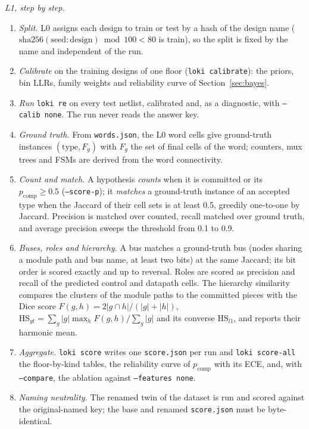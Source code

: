 \documentclass[conference]{IEEEtran}
\newcommand{\code}[1]{\texttt{#1}}
\begin{document}
\emph{L1, step by step.}
\begin{enumerate}
\item \emph{Split.} L0 assigns each design to train or test by a hash of the design name
 ($\mathrm{sha256}(\mathrm{seed}{:}\mathrm{design})\bmod 100<80$ is train), so the split is
 fixed by the name and independent of the run.
\item \emph{Calibrate} on the training designs of one floor (\code{loki calibrate}): the
 priors, bin LLRs, family weights and reliability curve of Section~\ref{sec:bayes}.
\item \emph{Run} \code{loki re} on every test netlist, calibrated and, as a diagnostic,
 with \code{--calib none}. The run never reads the answer key.
\item \emph{Ground truth.} From \code{words.json}, the L0 word cells give ground-truth
 instances $(\mathrm{type},F_g)$ with $F_g$ the set of final cells of the word; counters,
 mux trees and FSMs are derived from the word connectivity.
\item \emph{Count and match.} A hypothesis \emph{counts} when it is committed or its
 $p_{\mathrm{comp}}\ge 0.5$ (\code{--score-p}); it \emph{matches} a ground-truth instance of
 an accepted type when the Jaccard of their cell sets is at least 0.5, greedily
 one-to-one by Jaccard. Precision is matched over counted, recall matched over ground truth,
 and average precision sweeps the threshold from 0.1 to 0.9.
\item \emph{Buses, roles and hierarchy.} A bus matches a ground-truth bus (nodes sharing a
 module path and bus name, at least two bits) at the same Jaccard; its bit order is scored
 exactly and up to reversal. Roles are scored as precision and recall of the predicted
 control and datapath cells. The hierarchy similarity compares the clusters of the module
 paths to the committed pieces with the Dice score $F(g,h)=2|g\cap h|/(|g|+|h|)$,
 $\mathrm{HS}_{gt}=\sum_g|g|\max_h F(g,h)/\sum_g|g|$ and its converse $\mathrm{HS}_{l1}$, and
 reports their harmonic mean.
\item \emph{Aggregate.} \code{loki score} writes one \code{score.json} per run and
 \code{loki score-all} the floor-by-kind tables, the reliability curve of $p_{\mathrm{comp}}$
 with its ECE, and, with \code{--compare}, the ablation against \code{--features none}.
\item \emph{Naming neutrality.} The renamed twin of the dataset is run and scored against the
 original-named key; the base and renamed \code{score.json} must be byte-identical.
\end{enumerate}
\end{document}
